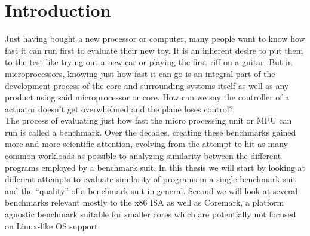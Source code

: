 \documentclass[../bachelor_paper.tex]{subfiles}
\begin{document}
\chapter{Introduction}
    \label{ch:intro}

Just having bought a new processor or computer, many people want to know how fast it can run first to evaluate their new toy. It is an inherent desire to put them to the test like trying out a new car or playing the first riff on a guitar. But in microprocessors, knowing just how fast it can go is an integral part of the development process of the core and surrounding systems itself as well as any product using said microprocessor or core. How can we say the controller of a actuator doesn't get overwhelmed and the plane loses control?\\ 
The process of evaluating just how fast the micro processing unit or \acs{MPU} can run is called a benchmark. Over the decades, creating these benchmarks gained more and more scientific attention, evolving from the attempt to hit as many common workloads as possible to analyzing similarity between the different programs employed by a benchmark suit. In this thesis we will start by looking at different attempts to evaluate similarity of programs in a single benchmark suit and the ``quality'' of a benchmark suit in general. Second we will look at several benchmarks relevant mostly to the x86 \acs{ISA} as well as Coremark\cite{gal-onExploringCoremarkBenchmark2012}, a platform agnostic benchmark suitable for smaller cores which are potentially not focused on Linux-like \acs{OS} support.

\isstandalone



\fi
\end{document}
